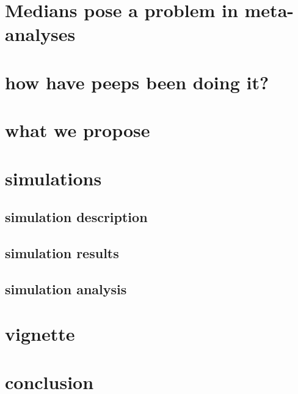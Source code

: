 





\maketitle


\begin{abstract}
\end{abstract}


\section{Medians pose a problem in meta-analyses}


\section{how have peeps been doing it?}

\section{what we propose}

\section{simulations}

\subsection{simulation description}

\subsection{simulation results}

\subsection{simulation analysis}

\section{ vignette}

\section{conclusion}



